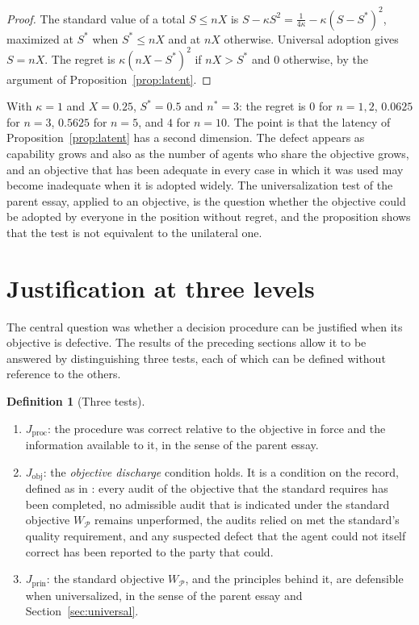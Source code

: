 \documentclass[11pt]{article}
\theoremstyle{plain}
\theoremstyle{definition}
\newtheorem{definition}{Definition}
\begin{document}
\begin{proof}
The standard value of a total $S\le nX$ is $S-\kappa S^2=\frac1{4\kappa}-\kappa(S-S^*)^2$, maximized at $S^*$ when $S^*\le nX$ and at $nX$ otherwise. Universal adoption gives $S=nX$. The regret is $\kappa(nX-S^*)^2$ if $nX>S^*$ and $0$ otherwise, by the argument of Proposition~\ref{prop:latent}.
\end{proof}

With $\kappa=1$ and $X=0.25$, $S^*=0.5$ and $n^*=3$: the regret is $0$ for $n=1,2$, $0.0625$ for $n=3$, $0.5625$ for $n=5$, and $4$ for $n=10$. The point is that the latency of Proposition~\ref{prop:latent} has a second dimension. The defect appears as capability grows and also as the number of agents who share the objective grows, and an objective that has been adequate in every case in which it was used may become inadequate when it is adopted widely. The universalization test of the parent essay, applied to an objective, is the question whether the objective could be adopted by everyone in the position without regret, and the proposition shows that the test is not equivalent to the unilateral one.

\section{Justification at three levels}\label{sec:three}

The central question was whether a decision procedure can be justified when its objective is defective. The results of the preceding sections allow it to be answered by distinguishing three tests, each of which can be defined without reference to the others.

\begin{definition}[Three tests]\label{def:three}
\begin{enumerate}[label=(\alph*),nosep]
\item $J_{\mathrm{proc}}$: the procedure was correct relative to the objective in force and the information available to it, in the sense of the parent essay.
\item $J_{\mathrm{obj}}$: the \emph{objective discharge} condition holds. It is a condition on the record, defined as in \cite{flyxion2026stop}: every audit of the objective that the standard requires has been completed, no admissible audit that is indicated under the standard objective $W_{\mathcal P}$ remains unperformed, the audits relied on met the standard's quality requirement, and any suspected defect that the agent could not itself correct has been reported to the party that could.
\item $J_{\mathrm{prin}}$: the standard objective $W_{\mathcal P}$, and the principles behind it, are defensible when universalized, in the sense of the parent essay and Section~\ref{sec:universal}.
\end{enumerate}
\end{definition}
\end{document}
